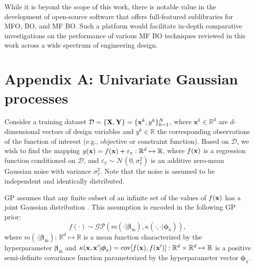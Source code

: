 \documentclass[journal ]{new-aiaa}
\newcommand{\edit}[1]{\textcolor{red!80!black}{#1}} %
\begin{document}
	While it is beyond the scope of this work, there is notable value in the development of open-source software that offers full-featured sublibraries for MFO, BO, and MF BO.
	Such a platform would facilitate in-depth comparative investigations on the performance of various MF BO techniques reviewed in this work across a wide spectrum of engineering design.
	
	\section*{Appendix A: Univariate Gaussian processes}\label{AppA}
	\setcounter{equation}{0} %
	\renewcommand{\theequation}{A.\arabic{equation}} %
	
	Consider a training dataset $\mathcal{D}=\left\{ {\bf X},{\bf Y}\right\}=\{{\bf x}^k,y^k\}_{k=1}^N$, where $\textbf{x}^k\in\mathbb{R}^d$ are $d$-dimensional vectors of design variables and $y^k\in\mathbb{R}$ the corresponding observations of the function of interest (e.g., objective or constraint function).
	Based on $\mathcal{D}$, we wish to find the mapping $y({\bf x})=f({\bf x}) + \varepsilon_\text{y}: \mathbb{R}^d \mapsto \mathbb{R}$, where $f({\bf x})$ is a regression function conditioned on $\mathcal{D}$, and $\varepsilon_\text{y} \sim \mathcal{N}(0,\sigma^2_\text{y})$ is an additive zero-mean Gaussian noise with variance $\sigma^2_\text{y}$.
	Note that the noise is assumed to be independent and identically distributed.
	
	GP assumes that any finite subset of an infinite set of the values of $f({\bf x})$ has a joint Gaussian distribution \citep{Rasmussen2006}.
	This assumption is encoded in the following GP prior:
	\begin{equation}\label{eqnA1}
		f(\cdot) \sim \mathcal{GP} \left(m(\cdot|\boldsymbol \beta_\text{m}),\kappa(\cdot,\cdot|\boldsymbol \phi_{\text{x}})\right),
	\end{equation}
	where  $m(\cdot|\boldsymbol \beta_{\text{m}})$: $\mathbb{R}^d \mapsto \mathbb{R}$ is a mean function characterized by the hyperparameter $\boldsymbol \beta_{\text{m}}$ and $\kappa({\bf x},{\bf x}'|\boldsymbol \phi_{\text{x}}) = \text{cov}[f({\bf x}),f({\bf x}')]: \mathbb{R}^d \times \mathbb{R}^d \mapsto \mathbb{R} $ is %
	{a positive semi-definite} covariance function parameterized by the hyperparameter vector $\boldsymbol \phi_{\text{x}}$.
	
\end{document}
